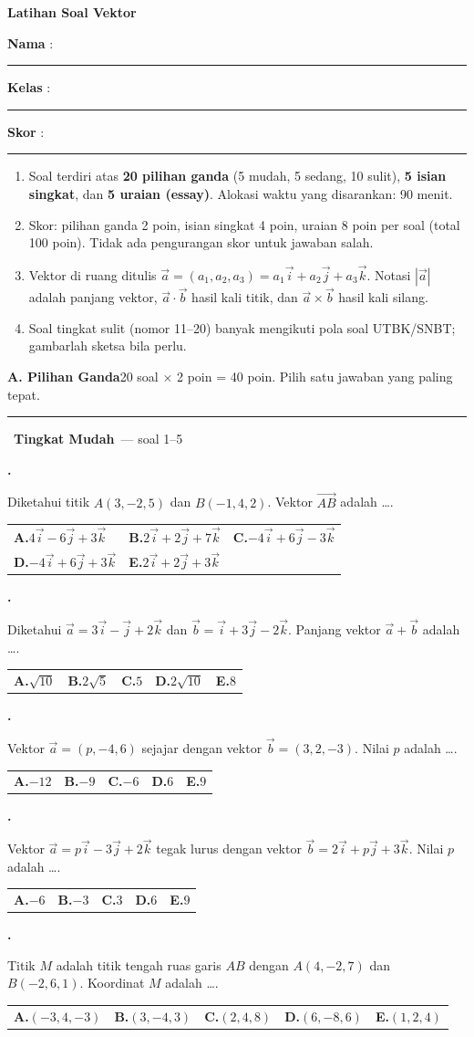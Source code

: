 \documentclass[a4paper,11pt]{article}
\makeatletter
\newcommand{\ov}[1]{\overrightarrow{#1}}
\newcounter{no}
\newcommand{\bagian}[2]{\par\Needspace{6\baselineskip}\vspace{1.0em}\noindent
  \begin{tcolorbox}[colback=navy,colframe=navy,coltext=white,boxrule=0pt,arc=2pt,left=6pt,right=6pt,top=3pt,bottom=3pt]
  \textbf{#1}\hfill{\small #2}\end{tcolorbox}\setcounter{no}{0}\par\vspace{-0.3em}}
\newcommand{\tingkat}[2]{\par\Needspace{7\baselineskip}\vspace{0.6em}\noindent
  {\color{teal}\rule{3pt}{1.1em}}\ {\color{navy}\bfseries #1}\ {\small\color{gray}--- #2}\par\vspace{0.1em}}
\newcommand{\soal}[2]{\par\vspace{0.75em}\stepcounter{no}\noindent
  \begin{minipage}[t]{1.8em}\textbf{\theno.}\end{minipage}%
  \begin{minipage}[t]{\dimexpr\linewidth-1.8em\relax}#1\par\vspace{0.35em}#2\end{minipage}\par}
\newcommand{\pil}[5]{\begin{tabularx}{\linewidth}{@{}*{5}{X}@{}}\textbf{A.}\;$#1$ & \textbf{B.}\;$#2$ & \textbf{C.}\;$#3$ & \textbf{D.}\;$#4$ & \textbf{E.}\;$#5$\end{tabularx}}
\newcommand{\pilt}[5]{\begin{tabularx}{\linewidth}{@{}*{3}{X}@{}}\textbf{A.}\;$#1$ & \textbf{B.}\;$#2$ & \textbf{C.}\;$#3$\\[3pt]\textbf{D.}\;$#4$ & \textbf{E.}\;$#5$ & \end{tabularx}}
\makeatother
\begin{document}
\thispagestyle{fancy}

\begin{center}
  {\color{navy}\fontsize{22}{26}\selectfont\bfseries Latihan Soal Vektor\par}
\end{center}
\vspace{2pt}
\begin{tcolorbox}[colback=softbg,colframe=navy!40,boxrule=0.6pt,arc=3pt,left=8pt,right=8pt,top=5pt,bottom=5pt]
\noindent\textbf{Nama} : \rule{4.6cm}{0.4pt}\hfill\textbf{Kelas} : \rule{2.2cm}{0.4pt}\hfill\textbf{Skor} : \rule{2.2cm}{0.4pt}
\end{tcolorbox}
\vspace{2pt}
\begin{tcolorbox}[colback=white,colframe=teal,boxrule=0.8pt,arc=3pt,left=8pt,right=8pt,top=4pt,bottom=4pt,title={\bfseries Petunjuk Pengerjaan},coltitle=white,fonttitle=\small]
\small
\begin{enumerate}[leftmargin=1.4em,itemsep=1pt,topsep=1pt]
\item Soal terdiri atas \textbf{20 pilihan ganda} (5 mudah, 5 sedang, 10 sulit), \textbf{5 isian singkat}, dan \textbf{5 uraian (essay)}. Alokasi waktu yang disarankan: 90 menit.
\item Skor: pilihan ganda 2 poin, isian singkat 4 poin, uraian 8 poin per soal (total 100 poin). Tidak ada pengurangan skor untuk jawaban salah.
\item Vektor di ruang ditulis $\vec a=(a_1,a_2,a_3)=a_1\vec i+a_2\vec j+a_3\vec k$. Notasi $|\vec a|$ adalah panjang vektor, $\vec a\cdot\vec b$ hasil kali titik, dan $\vec a\times\vec b$ hasil kali silang.
\item Soal tingkat sulit (nomor 11--20) banyak mengikuti pola soal UTBK/SNBT; gambarlah sketsa bila perlu.
\end{enumerate}
\end{tcolorbox}

\bagian{A. Pilihan Ganda}{20 soal $\times$ 2 poin = 40 poin. Pilih satu jawaban yang paling tepat.}

\tingkat{Tingkat Mudah}{soal 1--5}
\soal{Diketahui titik $A(3,-2,5)$ dan $B(-1,4,2)$. Vektor $\ov{AB}$ adalah \dots.}{\pilt{4\vec i-6\vec j+3\vec k}{2\vec i+2\vec j+7\vec k}{-4\vec i+6\vec j-3\vec k}{-4\vec i+6\vec j+3\vec k}{2\vec i+2\vec j+3\vec k}}
\soal{Diketahui $\vec a=3\vec i-\vec j+2\vec k$ dan $\vec b=\vec i+3\vec j-2\vec k$. Panjang vektor $\vec a+\vec b$ adalah \dots.}{\pil{\sqrt{10}}{2\sqrt5}{5}{2\sqrt{10}}{8}}
\soal{Vektor $\vec a=(p,-4,6)$ sejajar dengan vektor $\vec b=(3,2,-3)$. Nilai $p$ adalah \dots.}{\pil{-12}{-9}{-6}{6}{9}}
\soal{Vektor $\vec a=p\vec i-3\vec j+2\vec k$ tegak lurus dengan vektor $\vec b=2\vec i+p\vec j+3\vec k$. Nilai $p$ adalah \dots.}{\pil{-6}{-3}{3}{6}{9}}
\soal{Titik $M$ adalah titik tengah ruas garis $AB$ dengan $A(4,-2,7)$ dan $B(-2,6,1)$. Koordinat $M$ adalah \dots.}{\pil{(-3,4,-3)}{(3,-4,3)}{(2,4,8)}{(6,-8,6)}{(1,2,4)}}
\end{document}

